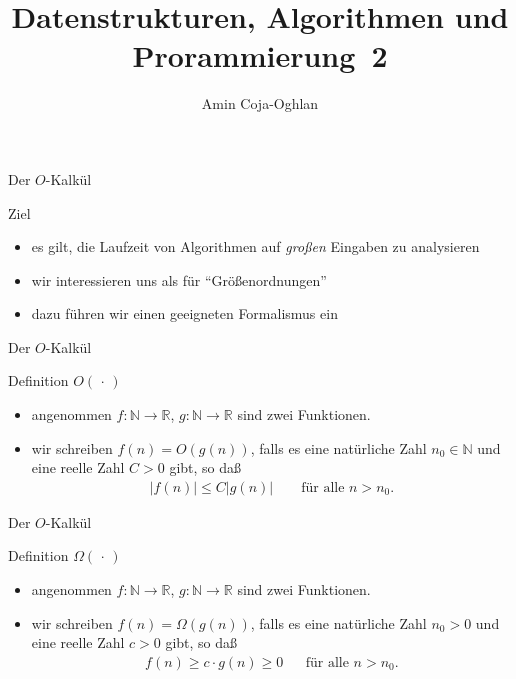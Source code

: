 \documentclass[aspectratio=1610, 11pt]{beamer}
\title{Datenstrukturen, Algorithmen und Prorammierung~2}
\author[A.~Coja-Oghlan]{Amin Coja-Oghlan}
\institute[DAP2]{Lehrstuhl Informatik 2\\Fakult\"at f\"ur Informatik}
\newcommand\nix{\,\cdot\,}
\newcommand\NN{\mathbb N}
\newcommand\RR{\mathbb R}
\begin{document}
\maketitle

\begin{frame}{Der $O$-Kalk\"ul}
	\begin{alertblock}{Ziel}
		\begin{itemize}
			\item es gilt, die Laufzeit von Algorithmen auf \emph{gro\ss en} Eingaben zu analysieren
			\item wir interessieren uns als f\"ur ``Gr\"o\ss enordnungen''
			\item dazu f\"uhren wir einen geeigneten Formalismus ein
		\end{itemize}
	\end{alertblock}
\end{frame}

\begin{frame}{Der $O$-Kalk\"ul}
	\begin{block}{Definition $O(\nix)$}
		\begin{itemize}
			\item angenommen $f:\NN\to\RR$, $g:\NN\to\RR$ sind zwei Funktionen.
			\item wir schreiben $f(n)=O(g(n))$, falls es eine nat\"urliche Zahl $n_0\in\NN$ und eine reelle Zahl $C>0$ gibt, so da\ss
				\begin{align*}
					|f(n)|\leq C|g(n)|\qquad\mbox{f\"ur alle }n>n_0.
				\end{align*}
		\end{itemize}
	\end{block}
\end{frame}

\begin{frame}{Der $O$-Kalk\"ul}
	\begin{block}{Definition $\Omega(\nix)$}
		\begin{itemize}
			\item angenommen $f:\NN\to\RR$, $g:\NN\to\RR$ sind zwei Funktionen.
			\item wir schreiben $f(n)=\Omega(g(n))$, falls es eine nat\"urliche Zahl $n_0>0$ und eine reelle Zahl $c>0$ gibt, so da\ss
				\begin{align*}
					f(n)\geq c\cdot g(n)\geq0&&\mbox{f\"ur alle }n>n_0.
				\end{align*}
		\end{itemize}
	\end{block}
\end{frame}
\end{document}

